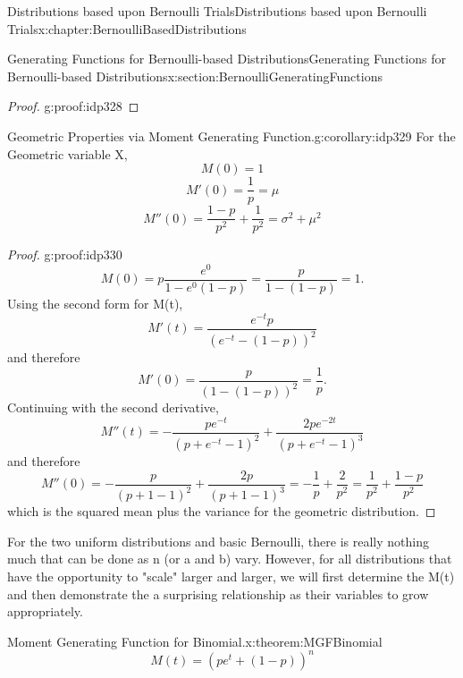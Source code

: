 \documentclass[oneside,10pt,]{book}
\numberwithin{equation}{section}
\begin{document}
\begin{chapterptx}{Distributions based upon Bernoulli Trials}{}{Distributions based upon Bernoulli Trials}{}{}{x:chapter:BernoulliBasedDistributions}
\begin{sectionptx}{Generating Functions for Bernoulli-based Distributions}{}{Generating Functions for Bernoulli-based Distributions}{}{}{x:section:BernoulliGeneratingFunctions}
\begin{proof}{}{g:proof:idp328}
\end{proof}
\begin{corollary}{Geometric Properties via Moment Generating Function.}{}{g:corollary:idp329}%
For the Geometric variable X,%
\begin{equation*}
M(0) = 1
\end{equation*}
%
\begin{equation*}
M'(0) = \frac{1}{p} = \mu
\end{equation*}
%
\begin{equation*}
M''(0) = \frac{1-p}{p^2} + \frac{1}{p^2} = \sigma^2 + \mu^2
\end{equation*}
%
\end{corollary}
\begin{proof}{}{g:proof:idp330}
%
\begin{equation*}
M(0) = p \frac{e^0 }{1 - e^0 (1-p)} = \frac{p}{1-(1-p)} = 1.
\end{equation*}
Using the second form for M(t),%
\begin{equation*}
M'(t) = \frac{e^{-t} p}{(e^{-t} - (1-p))^2}
\end{equation*}
and therefore%
\begin{equation*}
M'(0) = \frac{p}{(1-(1-p))^2} = \frac{1}{p}.
\end{equation*}
Continuing with the second derivative,%
\begin{equation*}
M''(t) = -\frac{p e^{-t} }{{\left(p + e^{-t} - 1\right)}^2} + \frac{2 p e^{-2t}}{{\left(p + e^{-t} - 1 \right)}^{3}}
\end{equation*}
and therefore%
\begin{equation*}
M''(0) = -\frac{p}{{\left(p + 1 - 1 \right)}^2} + \frac{2 p}{{\left(p + 1 - 1 \right)}^{3}} = -\frac{1}{p} + \frac{2}{p^2} = \frac{1}{p^2} + \frac{1-p}{p^2} 
\end{equation*}
which is the squared mean plus the variance for the geometric distribution.%
\end{proof}
For the two uniform distributions and basic Bernoulli, there is really nothing much that can be done as n (or a and b) vary.  However, for all distributions that have the opportunity to "scale" larger and larger, we will first determine the M(t) and then demonstrate the a surprising relationship as their variables to grow appropriately.%
\begin{theorem}{Moment Generating Function for Binomial.}{}{x:theorem:MGFBinomial}%
%
\begin{equation*}
M(t) = \left ( p e^t + (1-p) \right )^n
\end{equation*}

\end{theorem}
\end{sectionptx}
\end{chapterptx}
\end{document}
